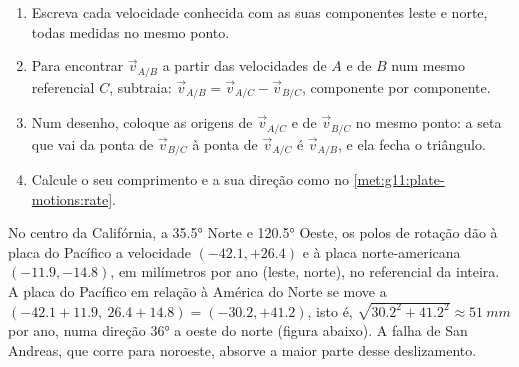 \begin{method}\label{met:g11:plate-motions:triangle}
\begin{enumerate}
  \item Escreva cada velocidade conhecida com as suas componentes leste e
        norte, todas medidas no mesmo ponto.
  \item Para encontrar $\vec v_{A/B}$ a partir das velocidades de $A$ e de
        $B$ num mesmo referencial $C$, subtraia: $\vec v_{A/B} = \vec v_{A/C} - \vec v_{B/C}$,
        componente por componente.
  \item Num desenho, coloque as origens de $\vec v_{A/C}$ e de $\vec v_{B/C}$
        no mesmo ponto: a seta que vai da ponta de $\vec v_{B/C}$ à ponta de
        $\vec v_{A/C}$ é $\vec v_{A/B}$, e ela fecha o triângulo.
  \item Calcule o seu comprimento e a sua direção como no
        \cref{met:g11:plate-motions:rate}.
\end{enumerate}
\end{method}

\begin{example}\label{ex:g11:plate-motions:san-andreas}
No centro da Califórnia, a \ang{35.5} Norte e \ang{120.5} Oeste, os polos de
rotação dão à placa do Pacífico a velocidade $(-42.1, +26.4)$ e à placa
norte-americana $(-11.9, -14.8)$, em milímetros por ano (leste, norte), no
referencial da  inteira. A placa do Pacífico em relação à América
do Norte se move a $(-42.1 + 11.9,\ 26.4 + 14.8) = (-30.2, +41.2)$, isto é,
$\sqrt{30.2^2 + 41.2^2} \approx \qty{51}{mm}$ por ano, numa direção
\ang{36} a oeste do norte (figura abaixo). A falha
de San Andreas, que corre para noroeste, absorve a maior parte desse
deslizamento.
\end{example}

